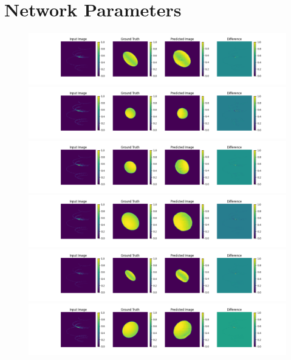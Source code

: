\section{Network Parameters}
\begin{figure}
	\centering
	\includegraphics[width=\linewidth]{fig/testing_image/image_1.png}
	\includegraphics[width=\linewidth]{fig/testing_image/image_3.png}
	\includegraphics[width=\linewidth]{fig/testing_image/image_4.png}
	\includegraphics[width=\linewidth]{fig/testing_image/image_10.png}
	\includegraphics[width=\linewidth]{fig/testing_image/image_12.png}
	\includegraphics[width=\linewidth]{fig/testing_image/image_15.png}

\end{figure}
